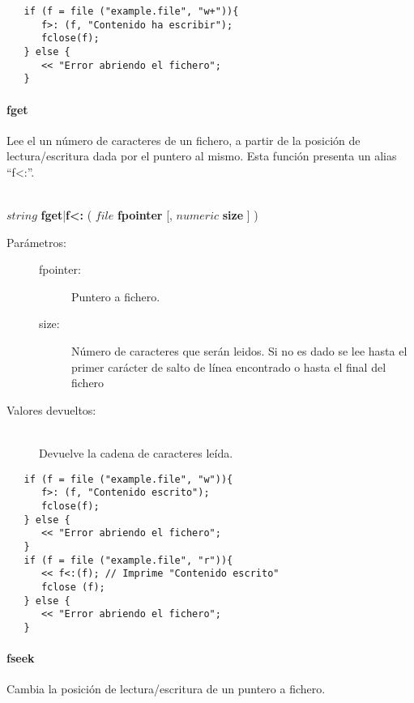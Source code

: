 \begin{lstlisting}  
   if (f = file ("example.file", "w+")){
      f>: (f, "Contenido ha escribir"); 
      fclose(f);
   } else {
      << "Error abriendo el fichero";
   }
\end{lstlisting}

\paragraph{fget}
Lee el un número de caracteres de un fichero, a partir de la posición de lectura/escritura dada por el puntero al mismo. Esta función presenta un alias ``f<:''.

\begin{framed}
\hfill \\ $string$ \textbf{fget}|\textbf{f<:} ( $file$ \textbf{fpointer} [, $numeric$ \textbf{size} ]  )  
\begin{description}
\item [Parámetros:] \hfill 
   \begin{description}
   \item[fpointer:] Puntero a fichero. 
   \item[size:] Número de caracteres que serán leidos. Si no es dado se lee hasta el primer carácter de salto de línea encontrado o hasta el final del fichero 
   \end{description}
\item[Valores devueltos:] \hfill \\
   Devuelve la cadena de caracteres leída.
\end{description}
\end{framed}

\begin{lstlisting}  
   if (f = file ("example.file", "w")){
      f>: (f, "Contenido escrito"); 
      fclose(f);
   } else {
      << "Error abriendo el fichero";
   }
   if (f = file ("example.file", "r")){
      << f<:(f); // Imprime "Contenido escrito"
      fclose (f);
   } else {
      << "Error abriendo el fichero";
   }
\end{lstlisting}

\paragraph{fseek}
Cambia la posición de lectura/escritura de un puntero a fichero.

